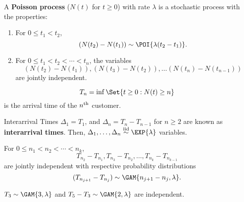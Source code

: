 \begin{Definition}{}{}
    A \textbf{Poisson process} ($ N(t) $ for $ t\ge 0 $) with rate $ \lambda $ is a stochastic process
    with the properties:
    \begin{enumerate}[(1)]
        \item For $ 0\le t_1<t_2 $,
              \[ (N(t_2)-N(t_1))\sim \POI{\lambda(t_2-t_1)}. \]
        \item For $ 0\le t_1<t_2<\cdots<t_n $, the variables
              \[ (N(t_2)-N(t_1)),(N(t_3)-N(t_2)),\ldots (N(t_n)-N(t_{n-1})) \]
              are jointly independent.
    \end{enumerate}
\end{Definition}
\begin{Definition}{}{}
    \[ T_n=\inf{\Set{t\ge 0\given N(t)\ge n}} \]
    is the arrival time of the $ n\textsuperscript{th} $ customer.
\end{Definition}
\begin{Theorem}{Interarrival Times}{}
    $ \Delta_1=T_1 $, and $ \Delta_n=T_n-T_{n-1} $ for $ n\ge 2 $ are known as
    \textbf{interarrival times}. Then,
    $ \Delta_1,\ldots,\Delta_n \iid \EXP{\lambda} $ variables.
\end{Theorem}
\begin{Corollary}{}{}
    For $ 0\le n_1<n_2<\cdots<n_k $,
    \[ T_{n_2}-T_{n_1},T_{n_3}-T_{n_2},\ldots,T_{n_k}-T_{n_{k-1}} \]
    are jointly independent with respective probability
    distributions
    \[ (T_{n_{j+1}}-T_{n_j})\sim \GAM{n_{j+1}-n_j,\lambda}. \]
\end{Corollary}
\begin{Example}{}{}
    $ T_3 \sim \GAM{3,\lambda} $ and
    $ T_5-T_3 \sim \GAM{2,\lambda} $ are independent.
\end{Example}
